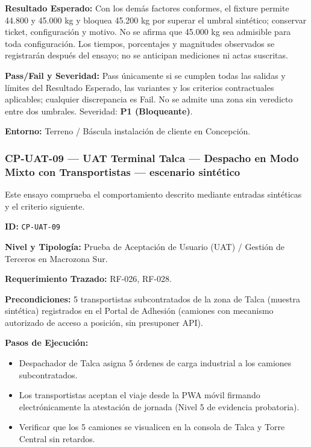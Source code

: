 \par\noindent\textbf{Resultado Esperado:} Con los demás factores conformes, el fixture permite 44.800 y 45.000 kg y bloquea 45.200 kg por superar el umbral sintético; conservar ticket, configuración y motivo. No se afirma que 45.000 kg sea admisible para toda configuración. Los tiempos, porcentajes y magnitudes observados se registrarán después del ensayo; no se anticipan mediciones ni actas suscritas.\par
\par\noindent\textbf{Pass/Fail y Severidad:} Pass únicamente si se cumplen todas las salidas y límites del Resultado Esperado, las variantes y los criterios contractuales aplicables; cualquier discrepancia es Fail. No se admite una zona sin veredicto entre dos umbrales. Severidad: \textbf{P1 (Bloqueante)}.\par
\par\noindent\textbf{Entorno:} Terreno / Báscula instalación de cliente en Concepción.\par






\subsubsection*{CP-UAT-09 — UAT Terminal Talca — Despacho en Modo Mixto con Transportistas — escenario sintético}\label{sec:9-cp-uat-09}

Este ensayo comprueba el comportamiento descrito mediante entradas sintéticas y el criterio siguiente.

\par\noindent\textbf{ID:} \texttt{CP-\allowbreak{}UAT-\allowbreak{}09}\par
\par\noindent\textbf{Nivel y Tipología:} Prueba de Aceptación de Usuario (UAT) / Gestión de Terceros en Macrozona Sur.\par
\par\noindent\textbf{Requerimiento Trazado:} RF-026, RF-028.\par
\par\noindent\textbf{Precondiciones:} 5 transportistas subcontratados de la zona de Talca (muestra sintética) registrados en el Portal de Adhesión (camiones con mecanismo autorizado de acceso a posición, sin presuponer API).\par
\par\noindent\textbf{Pasos de Ejecución:}\par
\begin{itemize}
\item Despachador de Talca asigna 5 órdenes de carga industrial a los camiones subcontratados.
\item Los transportistas aceptan el viaje desde la PWA móvil firmando electrónicamente la atestación de jornada (Nivel 5 de evidencia probatoria).
\item Verificar que los 5 camiones se visualicen en la consola de Talca y Torre Central sin retardos.
\end{itemize}

